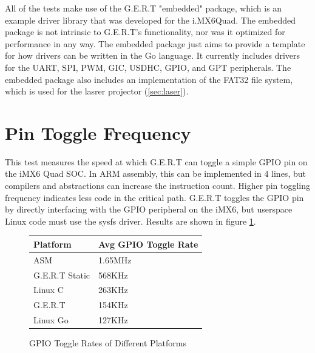 All of the tests make use of the G.E.R.T "embedded" package, which is an example
driver library that was developed for the i.MX6Quad. The embedded package is not intrinsic to G.E.R.T's
functionality, nor was it optimized for performance in any way. The embedded package
just aims to provide a template for how drivers can be written in the Go language.
It currently includes drivers for the UART, SPI, PWM, GIC, USDHC, GPIO, and GPT peripherals.
The embedded package also includes an implementation of the FAT32 file system, which is used
for the lasrer projector (\ref{sec:laser}).


\section{Pin Toggle Frequency}\label{sec:pin_toggle}
This test measures the speed at which G.E.R.T can toggle a simple GPIO pin on
the iMX6 Quad SOC. In ARM assembly, this can be implemented in 4 lines, but compilers and 
abstractions can increase the instruction count. Higher pin
toggling frequency indicates less code in the critical path.
G.E.R.T toggles the GPIO pin by directly interfacing with the GPIO
peripheral on the iMX6, but userspace Linux code must use the
sysfs driver.
Results are shown in figure \ref{fig:toggle}.


\begin{figure} [h]
\begin{center}
  \begin{tabular}{ | l | l |}
    \hline
    Platform & Avg GPIO Toggle Rate \\ \hline
    ASM & 1.65MHz \\ \hline
    G.E.R.T Static & 568KHz \\ \hline
    Linux C & 263KHz \\ \hline
    G.E.R.T & 154KHz \\ \hline
    Linux Go & 127KHz \\
    \hline
  \end{tabular}
\end{center}
  \caption{GPIO Toggle Rates of Different Platforms}  \label{fig:toggle}
\end{figure}

